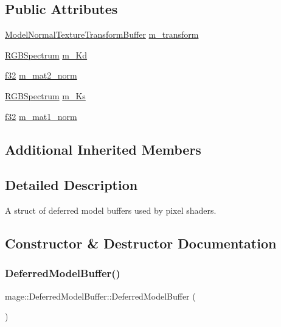 \subsection*{Public Attributes}
\begin{DoxyCompactItemize}
\item 
\hyperlink{structmage_1_1_model_normal_texture_transform_buffer}{Model\+Normal\+Texture\+Transform\+Buffer} \hyperlink{structmage_1_1_deferred_model_buffer_ae74080deb2222df1e84ffa326016ea8d}{m\+\_\+transform}
\item 
\hyperlink{structmage_1_1_r_g_b_spectrum}{R\+G\+B\+Spectrum} \hyperlink{structmage_1_1_deferred_model_buffer_aea013f9eb8c80ef6e3f83702286a12fa}{m\+\_\+\+Kd}
\item 
\hyperlink{namespacemage_a6a44ad388483959dc4dff9f2aef91431}{f32} \hyperlink{structmage_1_1_deferred_model_buffer_a2d9e491ddcba28b6cf0d09921a05a1d0}{m\+\_\+mat2\+\_\+norm}
\item 
\hyperlink{structmage_1_1_r_g_b_spectrum}{R\+G\+B\+Spectrum} \hyperlink{structmage_1_1_deferred_model_buffer_acff69877b5817d1d531cd9e1983e44d2}{m\+\_\+\+Ks}
\item 
\hyperlink{namespacemage_a6a44ad388483959dc4dff9f2aef91431}{f32} \hyperlink{structmage_1_1_deferred_model_buffer_addfcf1f4f721df5d5b78c33cfa423570}{m\+\_\+mat1\+\_\+norm}
\end{DoxyCompactItemize}
\subsection*{Additional Inherited Members}


\subsection{Detailed Description}
A struct of deferred model buffers used by pixel shaders. 

\subsection{Constructor \& Destructor Documentation}
\hypertarget{structmage_1_1_deferred_model_buffer_a34fee5aa2eb71c488c50c36bb5c90700}{}\label{structmage_1_1_deferred_model_buffer_a34fee5aa2eb71c488c50c36bb5c90700} 
\subsubsection{\texorpdfstring{Deferred\+Model\+Buffer()}{DeferredModelBuffer()}\hspace{0.1cm}{\footnotesize\ttfamily [1/3]}}
{\footnotesize\ttfamily mage\+::\+Deferred\+Model\+Buffer\+::\+Deferred\+Model\+Buffer (\begin{DoxyParamCaption}{ }\end{DoxyParamCaption})}


